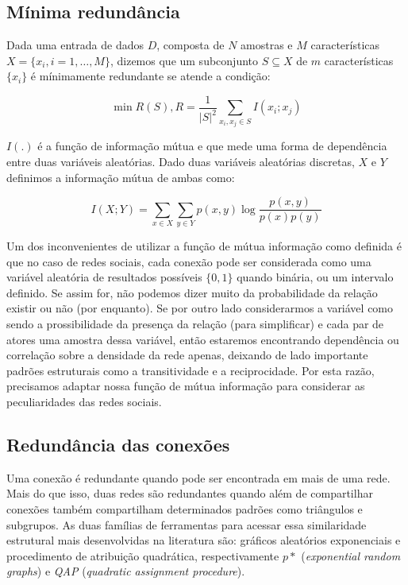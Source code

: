 \subsection{Mínima redundância}

Dada uma entrada de dados $D$, composta de $N$ amostras e $M$
características $X=\{x_i, i=1,\ldots,M\}$, dizemos que um subconjunto $S
\subseteq X$ de $m$ características $\{x_i\}$ é mínimamente redundante se atende
a condição:

\begin{equation}
\label{def:min_redun}
\min R(S), R = \frac{1}{|S|^2}\sum_{x_i, x_j \in S}I(x_i;x_j)
\end{equation}

$I(.)$ é a função de informação mútua e que mede uma forma de dependência entre
duas variáveis aleatórias. Dado duas variáveis aleatórias discretas, $X$ e $Y$
definimos a informação mútua de ambas como:

\begin{equation}
\label{def:inf_mutua}
I(X;Y) = \sum_{x\in X}\sum_{y\in Y}p(x,y)\log \frac{p(x,y)}{p(x)p(y)}
\end{equation}

Um dos inconvenientes de utilizar a função de mútua informação como definida é
que no caso de redes sociais, cada conexão pode ser considerada como uma
variável aleatória de resultados possíveis $\{0,1\}$ quando binária, ou um
intervalo definido. Se assim for, não podemos dizer muito da probabilidade da
relação existir ou não (por enquanto). Se por outro lado considerarmos a
variável como sendo a prossibilidade da presença da relação (para simplificar) e
cada par de atores uma amostra dessa variável, então estaremos encontrando
dependência ou correlação sobre a densidade da rede apenas, deixando de lado
importante padrões estruturais como a transitividade e a reciprocidade. Por esta
razão, precisamos adaptar nossa função de mútua informação para considerar as
peculiaridades das redes sociais. 

\subsection{Redundância das conexões}

Uma conexão é redundante quando pode ser encontrada em mais de uma rede. Mais do
que isso, duas redes são redundantes quando além de compartilhar conexões também
compartilham determinados padrões como triângulos e subgrupos. As duas
famílias de ferramentas para acessar essa similaridade estrutural mais
desenvolvidas na literatura são: gráficos aleatórios exponenciais e procedimento
de atribuição quadrática, respectivamente $p*$ (\emph{exponential random
graphs}) e \emph{QAP} (\emph{quadratic assignment procedure}).

